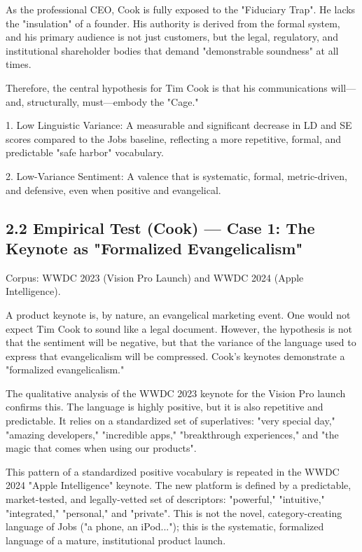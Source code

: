 \documentclass[12pt]{article}
\begin{document}
As the professional CEO, Cook is fully exposed to the "Fiduciary Trap". He lacks the "insulation" of a founder. His authority is derived from the formal system, and his primary audience is not just customers, but the legal, regulatory, and institutional shareholder bodies that demand "demonstrable soundness" at all times.

Therefore, the central hypothesis for Tim Cook is that his communications will—and, structurally, must—embody the "Cage."

1. Low Linguistic Variance: A measurable and significant decrease in LD and SE scores compared to the Jobs baseline, reflecting a more repetitive, formal, and predictable "safe harbor" vocabulary.

2. Low-Variance Sentiment: A valence that is systematic, formal, metric-driven, and defensive, even when positive and evangelical.

\subsection{2.2 Empirical Test (Cook) — Case 1: The Keynote as "Formalized Evangelicalism"}

Corpus: WWDC 2023 (Vision Pro Launch) and WWDC 2024 (Apple Intelligence).

A product keynote is, by nature, an evangelical marketing event. One would not expect Tim Cook to sound like a legal document. However, the hypothesis is not that the sentiment will be negative, but that the variance of the language used to express that evangelicalism will be compressed. Cook's keynotes demonstrate a "formalized evangelicalism."

The qualitative analysis of the WWDC 2023 keynote for the Vision Pro launch confirms this. The language is highly positive, but it is also repetitive and predictable. It relies on a standardized set of superlatives: "very special day," "amazing developers," "incredible apps," "breakthrough experiences," and "the magic that comes when using our products".

This pattern of a standardized positive vocabulary is repeated in the WWDC 2024 "Apple Intelligence" keynote. The new platform is defined by a predictable, market-tested, and legally-vetted set of descriptors: "powerful," "intuitive," "integrated," "personal," and "private". This is not the novel, category-creating language of Jobs ("a phone, an iPod..."); this is the systematic, formalized language of a mature, institutional product launch.
\end{document}
